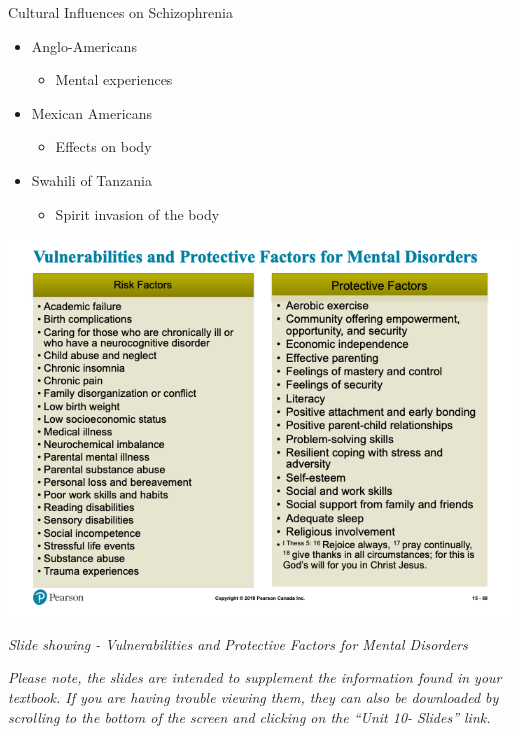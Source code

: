 \documentclass[
]{book}
\providecommand{\tightlist}{%
  \setlength{\itemsep}{0pt}\setlength{\parskip}{0pt}}
\begin{document}
\begin{reflect}
Cultural Influences on Schizophrenia

\begin{itemize}
\tightlist
\item
  Anglo-Americans

  \begin{itemize}
  \tightlist
  \item
    Mental experiences\\
  \end{itemize}
\item
  Mexican Americans

  \begin{itemize}
  \tightlist
  \item
    Effects on body\\
  \end{itemize}
\item
  Swahili of Tanzania

  \begin{itemize}
  \tightlist
  \item
    Spirit invasion of the body
  \end{itemize}
\end{itemize}

\includegraphics{assets/unit_10/slide_68.png}

\emph{Slide showing - Vulnerabilities and Protective Factors for Mental Disorders}

\emph{Please note, the slides are intended to supplement the information found in your textbook. If you are having trouble viewing them, they can also be downloaded by scrolling to the bottom of the screen and clicking on the ``Unit 10- Slides'' link.}


\end{reflect}
\end{document}
